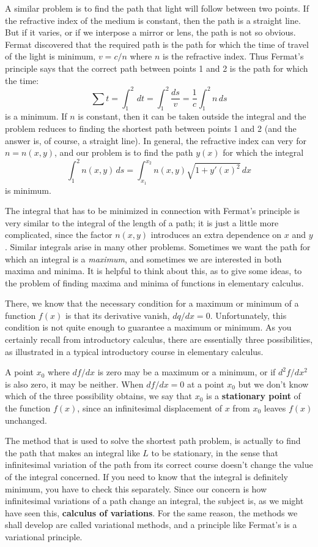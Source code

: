 A similar problem is to find the path that light will follow between two points. If the refractive index of the medium is constant, then the path is a straight line. But if it varies, or if we interpose a mirror or lens, the path is not so obvious. Fermat discovered that the required path is the path for which the time of travel of the light is minimum, $v=c/n$ where $n$ is the refractive index. Thus Fermat's principle says that the correct path between points 1 and 2 is the path for which the time: $$\sum t = \int _{1}^{2}  \, dt = \int _{1}^{2} \frac{ds}{v} = \frac{1}{c} \int _{1}^{2} n \, ds   $$
is a minimum. If $n$ is constant, then it can be taken outside the integral and the problem reduces to finding the shortest path between points 1 and 2 (and the answer is, of course, a straight line). In general, the refractive index can very for $n=n(x,y)$, and our problem is to find the path $y(x)$ for which the integral $$\int_{1}^{2} n(x,y) \, ds = \int _{x_{1}}^{x_{2}} n(x,y)\sqrt{ 1+y'(x)^{2} } \, dx  $$
is minimum. 

The integral that has to be minimized in connection with Fermat's principle is very similar to the integral of the length of a path; it is just a little more complicated, since the factor $n(x,y)$ introduces an extra dependence on $x$ and $y$. Similar integrals arise in many other problems. Sometimes we want the path for which an integral is a \textit{maximum}, and sometimes we are interested in both maxima and minima. It is helpful to think about this, as to give some ideas, to the problem of finding maxima and minima of functions in elementary calculus. 

There, we know that the necessary condition for a maximum or minimum of a function $f(x)$ is that its derivative vanish, $dq/dx=0$. Unfortunately, this condition is not quite enough to guarantee a maximum or minimum. As you certainly recall from introductory calculus, there are essentially three possibilities, as illustrated in a typical introductory course in elementary calculus. 

A point $x_{0}$ where $df/dx$ is zero may be a maximum or a minimum, or if $d^{2}f/dx^{2}$ is also zero, it may be neither. When $df/dx=0$ at a point $x_{0}$ but we don't know which of the three possibility obtains, we say that $x_{0}$ is a \textbf{stationary point} of the function $f(x)$, since an infinitesimal displacement of $x$ from $x_{0}$ leaves $f(x)$ unchanged. 

The method that is used to solve the shortest path problem, is actually to find the path that makes an integral like $L$ to be stationary, in the sense that infinitesimal variation of the path from its correct course doesn't change the value of the integral concerned. If you need to know that the integral is definitely minimum, you have to check this separately. Since our concern is how infinitesimal variations of a path change an integral, the subject is, as we might have seen this, \textbf{calculus of variations}. For the same reason, the methods we shall develop are called variational methods, and a principle like Fermat's is a variational principle. 
